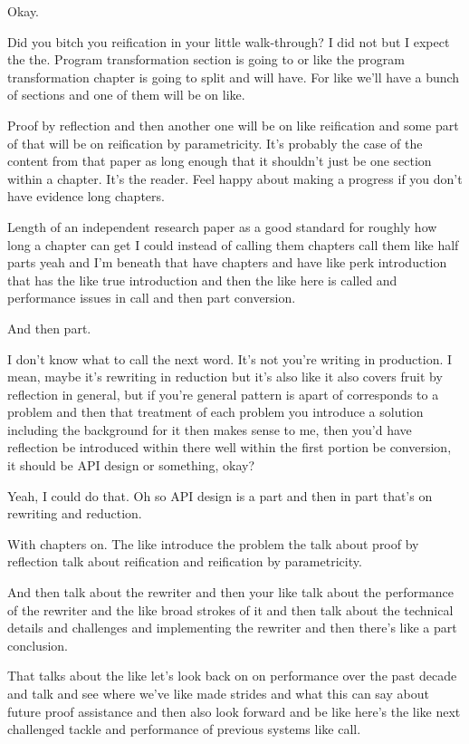 \begin{subappendices}
Okay. 

Did you bitch you reification in your little walk-through? I did not but I expect the the. Program transformation section is going to or like the program transformation chapter is going to split and will have. For like we'll have a bunch of sections and one of them will be on like. 

Proof by reflection and then another one will be on like reification and some part of that will be on reification by parametricity. It's probably the case of the content from that paper as long enough that it shouldn't just be one section within a chapter. It's the reader. Feel happy about making a progress if you don't have evidence long chapters. 

Length of an independent research paper as a good standard for roughly how long a chapter can get I could instead of calling them chapters call them like half parts yeah and I'm beneath that have chapters and have like perk introduction that has the like true introduction and then the like here is called and performance issues in call and then part conversion. 

And then part. 

I don't know what to call the next word. It's not you're writing in production. I mean, maybe it's rewriting in reduction but it's also like it also covers fruit by reflection in general, but if you're general pattern is apart of corresponds to a problem and then that treatment of each problem you introduce a solution including the background for it then makes sense to me, then you'd have reflection be introduced within there well within the first portion be conversion, it should be API design or something, okay? 

Yeah, I could do that. Oh so API design is a part and then in part that's on rewriting and reduction. 

With chapters on. The like introduce the problem the talk about proof by reflection talk about reification and reification by parametricity. 

And then talk about the rewriter and then your like talk about the performance of the rewriter and the like broad strokes of it and then talk about the technical details and challenges and implementing the rewriter and then there's like a part conclusion. 

That talks about the like let's look back on on performance over the past decade and talk and see where we've like made strides and what this can say about future proof assistance and then also look forward and be like here's the like next challenged tackle and performance of previous systems like call. 


\end{subappendices}
